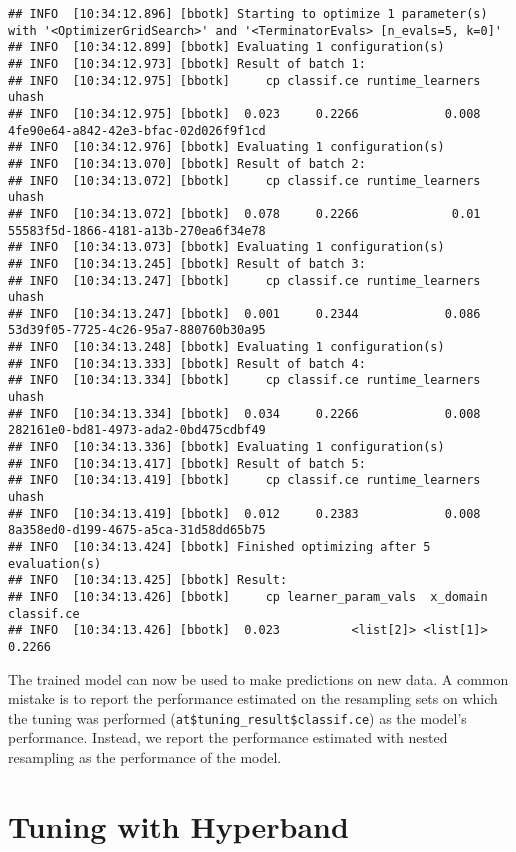\documentclass[
]{scrbook}
\begin{document}
\begin{verbatim}
## INFO  [10:34:12.896] [bbotk] Starting to optimize 1 parameter(s) with '<OptimizerGridSearch>' and '<TerminatorEvals> [n_evals=5, k=0]' 
## INFO  [10:34:12.899] [bbotk] Evaluating 1 configuration(s) 
## INFO  [10:34:12.973] [bbotk] Result of batch 1: 
## INFO  [10:34:12.975] [bbotk]     cp classif.ce runtime_learners                                uhash 
## INFO  [10:34:12.975] [bbotk]  0.023     0.2266            0.008 4fe90e64-a842-42e3-bfac-02d026f9f1cd 
## INFO  [10:34:12.976] [bbotk] Evaluating 1 configuration(s) 
## INFO  [10:34:13.070] [bbotk] Result of batch 2: 
## INFO  [10:34:13.072] [bbotk]     cp classif.ce runtime_learners                                uhash 
## INFO  [10:34:13.072] [bbotk]  0.078     0.2266             0.01 55583f5d-1866-4181-a13b-270ea6f34e78 
## INFO  [10:34:13.073] [bbotk] Evaluating 1 configuration(s) 
## INFO  [10:34:13.245] [bbotk] Result of batch 3: 
## INFO  [10:34:13.247] [bbotk]     cp classif.ce runtime_learners                                uhash 
## INFO  [10:34:13.247] [bbotk]  0.001     0.2344            0.086 53d39f05-7725-4c26-95a7-880760b30a95 
## INFO  [10:34:13.248] [bbotk] Evaluating 1 configuration(s) 
## INFO  [10:34:13.333] [bbotk] Result of batch 4: 
## INFO  [10:34:13.334] [bbotk]     cp classif.ce runtime_learners                                uhash 
## INFO  [10:34:13.334] [bbotk]  0.034     0.2266            0.008 282161e0-bd81-4973-ada2-0bd475cdbf49 
## INFO  [10:34:13.336] [bbotk] Evaluating 1 configuration(s) 
## INFO  [10:34:13.417] [bbotk] Result of batch 5: 
## INFO  [10:34:13.419] [bbotk]     cp classif.ce runtime_learners                                uhash 
## INFO  [10:34:13.419] [bbotk]  0.012     0.2383            0.008 8a358ed0-d199-4675-a5ca-31d58dd65b75 
## INFO  [10:34:13.424] [bbotk] Finished optimizing after 5 evaluation(s) 
## INFO  [10:34:13.425] [bbotk] Result: 
## INFO  [10:34:13.426] [bbotk]     cp learner_param_vals  x_domain classif.ce 
## INFO  [10:34:13.426] [bbotk]  0.023          <list[2]> <list[1]>     0.2266
\end{verbatim}

The trained model can now be used to make predictions on new data.
A common mistake is to report the performance estimated on the resampling sets on which the tuning was performed (\texttt{at\$tuning\_result\$classif.ce}) as the model's performance.
Instead, we report the performance estimated with nested resampling as the performance of the model.

\hypertarget{hyperband}{%
\section{Tuning with Hyperband}\label{hyperband}}
\end{document}
